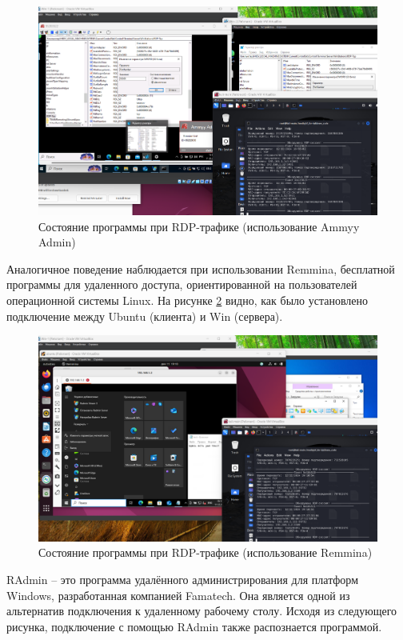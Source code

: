 \documentclass[spec, och, diploma]{SCWorks}
\begin{document}
\begin{figure}[H]
  \centering
  \includegraphics[width=1.0\textwidth]{pics/9ammyy.png}
  \caption{Состояние программы при RDP-трафике (использование Ammyy Admin)}
  \label{ammyy1}
\end{figure}

Аналогичное поведение наблюдается при использовании Remmina, бесплатной программы для удаленного доступа, ориентированной 
на пользователей операционной системы Linux. На рисунке \ref{remmina1} видно, как было установлено подключение между Ubuntu (клиента) и Win (сервера).  

\begin{figure}[H]
  \centering
  \includegraphics[width=1.0\textwidth]{pics/10remmina.png}
  \caption{Состояние программы при RDP-трафике (использование Remmina)}
  \label{remmina1}
\end{figure}


RAdmin -- это программа удалённого администрирования для платформ Windows, разработанная компанией Famatech. Она 
является одной из альтернатив подключения к удаленному рабочему столу. Исходя из следующего рисунка, подключение с помощью RAdmin
также распознается программой.
\end{document}
